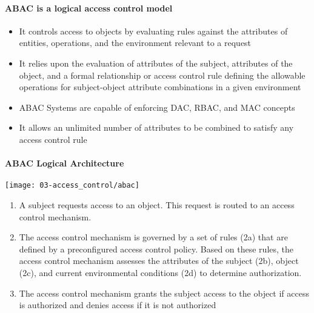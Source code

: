\paragraph{ABAC is a logical access control model}
\begin{itemize}
    \item It controls access to objects by evaluating rules against the attributes of entities, operations, and the environment relevant to a request
    \item It relies upon the evaluation of attributes of the subject, attributes of the object, and a formal relationship or access control rule defining the allowable operations for subject-object attribute combinations in a given environment
    \item ABAC Systems are capable of enforcing DAC, RBAC, and MAC concepts
    \item It allows an unlimited number of attributes to be combined to satisfy any access control rule
\end{itemize}

\paragraph{ABAC Logical Architecture}
\begin{center}
    \texttt{[image: 03-access\_control/abac]}
    \vspace{-8pt}
\end{center}

\begin{enumerate}
    \item A subject requests access to an object. This request is routed to an access control mechanism.
    \item The access control mechanism is governed by a set of rules (2a) that are defined by a preconfigured access control policy. Based on these rules, the access control mechanism assesses the attributes of the subject (2b), object (2c), and current environmental conditions (2d) to determine authorization.
    \item The access control mechanism grants the subject access to the object if access is authorized and denies access if it is not authorized
\end{enumerate}

\newpage

